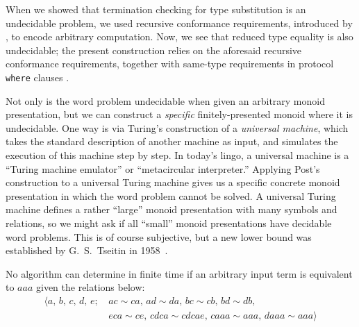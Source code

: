\documentclass[../generics]{subfiles}
\begin{document}
When we showed that termination checking for type substitution is an undecidable problem, we used recursive conformance requirements, introduced by \cite{se0157}, to encode arbitrary computation. Now, we see that reduced type equality is also undecidable; the present construction relies on the aforesaid recursive conformance requirements, together with same-type requirements in protocol \texttt{where} clauses \cite{se0142}.

Not only is the word problem undecidable when given an arbitrary monoid presentation, but we can construct a \emph{specific} finitely-presented monoid where it is undecidable. One way is via Turing's construction of a \emph{universal machine}, which takes the standard description of another machine as input, and simulates the execution of this machine step by step. In today's lingo, a universal machine is a ``Turing machine emulator'' or ``metacircular interpreter.'' Applying Post's construction to a universal Turing machine gives us a specific concrete monoid presentation in which the word problem cannot be solved. A universal Turing machine defines a rather ``large'' monoid presentation with many symbols and relations, so we might ask if all ``small'' monoid presentations have decidable word problems. This is of course subjective, but a new lower bound was established by G.~S.~Tseitin in 1958~\cite{undecidablesemigroup}.
\begin{theorem}\label{undecidablemonoid}
No algorithm can determine in finite time if an arbitrary input term is equivalent to $aaa$ given the relations below:
\begin{align*}
\langle a,\,b,\,c,\,d,\,e;\,&ac\sim ca,\,ad\sim da,\,bc\sim cb,\,bd\sim db,\\
&eca\sim ce,\,cdca\sim cdcae,\,caaa\sim aaa,\,daaa\sim aaa\rangle
\end{align*}
\end{theorem}
\end{document}
